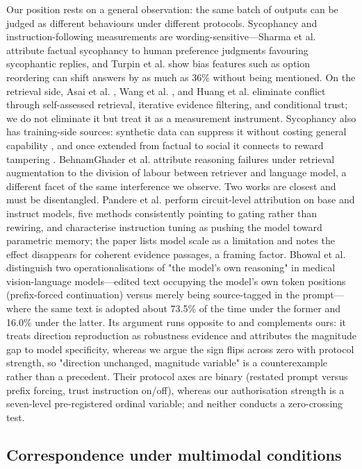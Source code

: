 \documentclass[pdflatex,sn-basic,Numbered]{sn-jnl}
\theoremstyle{thmstyleone}
\theoremstyle{thmstyletwo}
\theoremstyle{thmstylethree}
\begin{document}
Our position rests on a general observation: the same batch of outputs can be judged as different behaviours under different protocols. Sycophancy and instruction-following measurements are wording-sensitive—Sharma et al. \cite{ref8} attribute factual sycophancy to human preference judgments favouring sycophantic replies, and Turpin et al. \cite{ref9} show bias features such as option reordering can shift answers by as much as 36\% without being mentioned. On the retrieval side, Asai et al. \cite{ref26}, Wang et al. \cite{ref24}, and Huang et al. \cite{ref25} eliminate conflict through self-assessed retrieval, iterative evidence filtering, and conditional trust; we do not eliminate it but treat it as a measurement instrument. Sycophancy also has training-side sources: synthetic data can suppress it without costing general capability \cite{ref44}, and once extended from factual to social it connects to reward tampering \cite{ref45,ref46}. BehnamGhader et al. \cite{ref27} attribute reasoning failures under retrieval augmentation to the division of labour between retriever and language model, a different facet of the same interference we observe. Two works are closest and must be disentangled. Pandere et al. \cite{ref11} perform circuit-level attribution on base and instruct models, five methods consistently pointing to gating rather than rewiring, and characterise instruction tuning as pushing the model toward parametric memory; the paper lists model scale as a limitation and notes the effect disappears for coherent evidence passages, a framing factor. Bhowal et al. \cite{ref17} distinguish two operationalisations of "the model's own reasoning" in medical vision-language models—edited text occupying the model's own token positions (prefix-forced continuation) versus merely being source-tagged in the prompt—where the same text is adopted about 73.5\% of the time under the former and 16.0\% under the latter. Its argument runs opposite to and complements ours: it treats direction reproduction as robustness evidence and attributes the magnitude gap to model specificity, whereas we argue the sign flips across zero with protocol strength, so "direction unchanged, magnitude variable" is a counterexample rather than a precedent. Their protocol axes are binary (restated prompt versus prefix forcing, trust instruction on/off), whereas our authorisation strength is a seven-level pre-registered ordinal variable; and neither conducts a zero-crossing test.

\subsection{Correspondence under multimodal conditions}
\label{sec:2-4}
\end{document}
